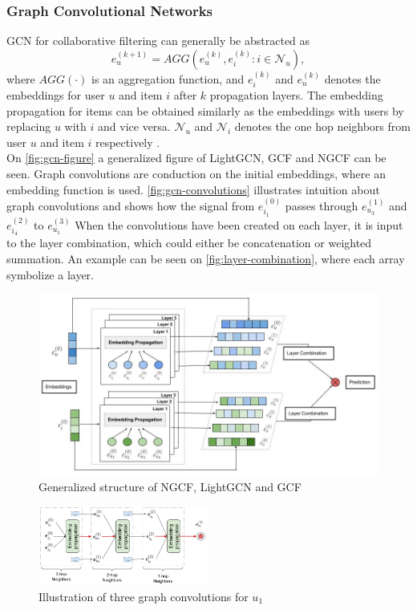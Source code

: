 \subsubsection{Graph Convolutional Networks}
GCN for collaborative filtering can generally be abstracted as \cite{BiTGCF}
\begin{equation}
    e_u^{(k+1)} = AGG(e_u^{(k)},e_i^{(k)} : i \in \mathcal{N}_u),
\end{equation}
where $AGG(\cdot)$ is an aggregation function, and $e_i^{(k)}$ and $e_u^{(k)}$ denotes the embeddings for user $u$ and item $i$ after $k$ propagation layers.
The embedding propagation for items can be obtained similarly as the embeddings with users by replacing $u$ with $i$ and vice versa.
$\mathcal{N}_u$ and $\mathcal{N}_i$ denotes the one hop neighbors from user $u$ and item $i$ respectively \cite{lightgcn,BiTGCF,NGCF_2019}.\\
On \autoref{fig:gcn-figure} a generalized figure of LightGCN, GCF and NGCF can be seen.
Graph convolutions are conduction on the initial embeddings, where an embedding function is used.
\autoref{fig:gcn-convolutions} illustrates intuition about graph convolutions and shows how the signal from $e_{i_1}^{(0)}$ passes through $e_{u_3}^{(1)}$ and $e_{i_4}^{(2)}$ to $e_{u_1}^{(3)}$
When the convolutions have been created on each layer, it is input to the layer combination, which could either be concatenation or weighted summation.
An example can be seen on \autoref{fig:layer-combination}, where each array symbolize a layer.
\begin{figure}[h!]
    \includegraphics[width=1.1\textwidth]{figures/generalized-gcn-figure.PNG}
    \centering
    \caption{Generalized structure of NGCF, LightGCN and GCF}
    \label{fig:gcn-figure}
\end{figure}
\begin{figure}[h!]
    \includegraphics[width=0.5\textwidth]{figures/embedding-convolutions.png}
    \centering
    \caption{Illustration of three graph convolutions for $u_1$}
    \label{fig:gcn-convolutions}
\end{figure}
